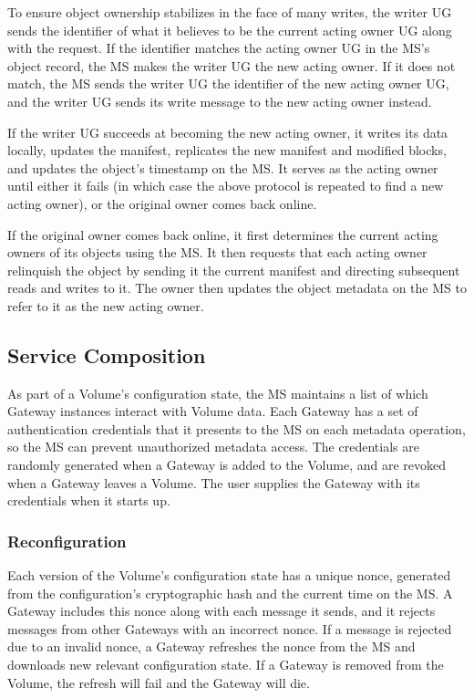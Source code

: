 To ensure object ownership stabilizes in the face of many writes, the writer UG sends the identifier of what it believes to be the current acting owner UG along with the request. If the identifier matches the acting owner UG in the MS's object record, the MS makes the writer UG the new acting owner. If it does not match, the MS sends the writer UG the identifier of the new acting owner UG, and the writer UG sends its write message to the new acting owner instead.

If the writer UG succeeds at becoming the new acting owner, it writes its data locally, updates the manifest, replicates the new manifest and modified blocks, and updates the object's timestamp on the MS. It serves as the acting owner until either it fails (in which case the above protocol is repeated to find a new acting owner), or the original owner comes back online.

If the original owner comes back online, it first determines the current acting owners of its objects using the MS. It then requests that each acting owner relinquish the object by sending it the current manifest and directing subsequent reads and writes to it. The owner then updates the object metadata on the MS to refer to it as the new acting owner.

\subsection{Service Composition}

As part of a Volume's configuration state, the MS maintains a list of which Gateway instances interact with Volume data. Each Gateway has a set of authentication credentials that it presents to the MS on each metadata operation, so the MS can prevent unauthorized metadata access. The credentials are randomly generated when a Gateway is added to the Volume, and are revoked when a Gateway leaves a Volume. The user supplies the Gateway with its credentials when it starts up.

\subsubsection{Reconfiguration}

Each version of the Volume's configuration state has a unique nonce, generated from the configuration's cryptographic hash and the current time on the MS. A Gateway includes this nonce along with each message it sends, and it rejects messages from other Gateways with an incorrect nonce. If a message is rejected due to an invalid nonce, a Gateway refreshes the nonce from the MS and downloads new relevant configuration state. If a Gateway is removed from the Volume, the refresh will fail and the Gateway will die.

